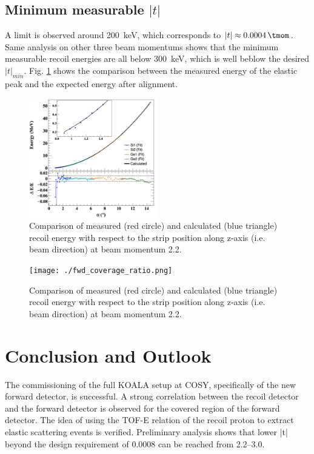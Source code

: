 \documentclass[number,5p]{elsarticle}
\begin{document}
\subsection{Minimum measurable $|t|$}
\label{sec:minimum_t}

A limit is observed around \SI{200}{\keV}, which corresponds to $|t| \approx  \SI{0.0004}{\tmom}$.
Same analysis on other three beam momentums shows that the minimum measurable
recoil energies are all below \SI{300}{\keV}, which is well beblow the desired $|t|_{min}$.
Fig. \ref{fig:measured_vs_calculated} shows the comparison between the measured
energy of the elastic peak and the expected energy after alignment.

\begin{figure}[h!]
  \centering
  \includegraphics[width=0.5\textwidth]{./e_vs_alpha_combined.png}
  \caption{
    Comparison of measured (red circle) and calculated (blue triangle) recoil energy with respect to the strip position along z-axis (i.e. beam direction) at beam momentum \SI{2.2}{\momentum}.}
  \label{fig:measured_vs_calculated}
\end{figure}

\begin{figure}[h!]
  \centering
  \texttt{[image: ./fwd\_coverage\_ratio.png]}
  \caption{
    Comparison of measured (red circle) and calculated (blue triangle) recoil energy with respect to the strip position along z-axis (i.e. beam direction) at beam momentum \SI{2.2}{\momentum}.}
  \label{fig:fwd_coverage_ratio}
\end{figure}


\section{Conclusion and Outlook}
\label{sec:conclusion}

The commissioning of the full KOALA setup at COSY, specifically of the new forward detector, is successful.
A strong correlation between the recoil detector and the forward detector is
observed for the covered region of the forward detector.
The idea of using the TOF-E relation of the recoil proton to extract elastic
scattering events is verified.
Preliminary analysis shows that lower |t| beyond the design requirement of \SI{0.0008}{\tmom} can be reached from \SIrange{2.2}{3.0}{\momentum}. 
\end{document}
